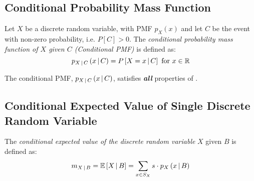	\subsection{Conditional Probability Mass Function} \label{subsec:Conditional Probability Mass Function}
		\begin{definition} \label{def:Conditional Probability Mass Function}
			Let $X$ be a discrete random variable, with PMF $p_{X} \left( x \right)$ and let $C$ be the event with non-zero probability, i.e. $P \left[ C \right] > 0$.
			The \emph{conditional probability mass function of $X$ given $C$ (Conditional PMF)} is defined as:
			\begin{equation} \label{eq:Conditional Probability Mass Function}
				p_{X \operatorname{\vert} C} \left( x \operatorname{\vert} C \right) = P \left[ X=x \operatorname{\vert} C \right] \text{ for } x \in \operatorname{\mathbb{R}}
			\end{equation}
			\begin{remark} \label{rmk:Properties of Conditional Probability Mass Functions}
				The conditional PMF, $p_{X \operatorname{\vert} C} \left( x \operatorname{\vert} C \right)$, satisfies \emph{\textbf{all}} properties of .
			\end{remark}
		\end{definition}
	\subsection{Conditional Expected Value of Single Discrete Random Variable} \label{subsec:Conditional Expected Value of Single Discrete}
		\begin{definition} \label{def:Conditional Expected Value of Single Discrete}
			The \emph{conditional expected value of the discrete random variable} $X$ given $B$ is defined as:
			\begin{equation} \label{eq:Conditional Expected Value of Single Discrete}
				m_{X \operatorname{\vert} B} = \operatorname{\operatorname{\mathbb{E}}} \left[ X \operatorname{\vert} B \right] = \sum\limits_{x \in S_{X}} s \cdot p_{X} \left( x \operatorname{\vert} B \right)
			\end{equation}
		\end{definition}
	
